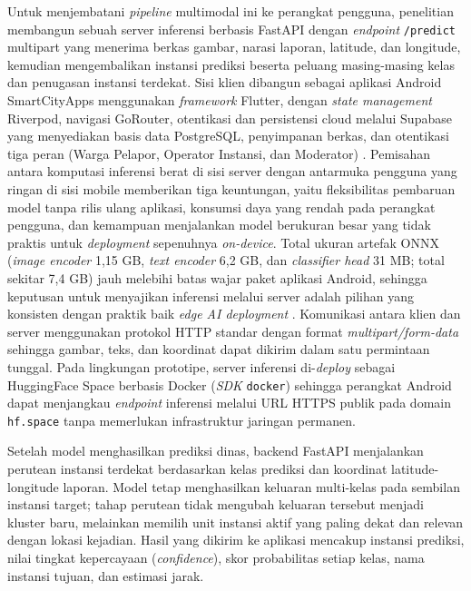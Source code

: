 Untuk menjembatani \textit{pipeline} multimodal ini ke perangkat pengguna, penelitian membangun sebuah server inferensi berbasis FastAPI dengan \textit{endpoint} \texttt{/predict} multipart yang menerima berkas gambar, narasi laporan, latitude, dan longitude, kemudian mengembalikan instansi prediksi beserta peluang masing-masing kelas dan penugasan instansi terdekat. Sisi klien dibangun sebagai aplikasi Android SmartCityApps menggunakan \textit{framework} Flutter, dengan \textit{state management} Riverpod, navigasi GoRouter, otentikasi dan persistensi cloud melalui Supabase yang menyediakan basis data PostgreSQL, penyimpanan berkas, dan otentikasi tiga peran (Warga Pelapor, Operator Instansi, dan Moderator) \citep{flutterdoc2024,riverpoddoc2024,supabaseDoc2024}. Pemisahan antara komputasi inferensi berat di sisi server dengan antarmuka pengguna yang ringan di sisi mobile memberikan tiga keuntungan, yaitu fleksibilitas pembaruan model tanpa rilis ulang aplikasi, konsumsi daya yang rendah pada perangkat pengguna, dan kemampuan menjalankan model berukuran besar yang tidak praktis untuk \textit{deployment} sepenuhnya \textit{on-device}. Total ukuran artefak ONNX (\textit{image encoder} 1,15 GB, \textit{text encoder} 6,2 GB, dan \textit{classifier head} 31 MB; total sekitar 7,4 GB) jauh melebihi batas wajar paket aplikasi Android, sehingga keputusan untuk menyajikan inferensi melalui server adalah pilihan yang konsisten dengan praktik baik \textit{edge AI deployment} \citep{amorEdgeAIPractice2025,wangEmpoweringEdgeIntelligence2025}. Komunikasi antara klien dan server menggunakan protokol HTTP standar dengan format \textit{multipart/form-data} sehingga gambar, teks, dan koordinat dapat dikirim dalam satu permintaan tunggal. Pada lingkungan prototipe, server inferensi di-\textit{deploy} sebagai HuggingFace Space berbasis Docker (\textit{SDK} \texttt{docker}) sehingga perangkat Android dapat menjangkau \textit{endpoint} inferensi melalui URL HTTPS publik pada domain \texttt{hf.space} tanpa memerlukan infrastruktur jaringan permanen.

Setelah model menghasilkan prediksi dinas, backend FastAPI menjalankan perutean instansi terdekat berdasarkan kelas prediksi dan koordinat latitude-longitude laporan. Model tetap menghasilkan keluaran multi-kelas pada sembilan instansi target; tahap perutean tidak mengubah keluaran tersebut menjadi kluster baru, melainkan memilih unit instansi aktif yang paling dekat dan relevan dengan lokasi kejadian. Hasil yang dikirim ke aplikasi mencakup instansi prediksi, nilai tingkat kepercayaan (\textit{confidence}), skor probabilitas setiap kelas, nama instansi tujuan, dan estimasi jarak.

